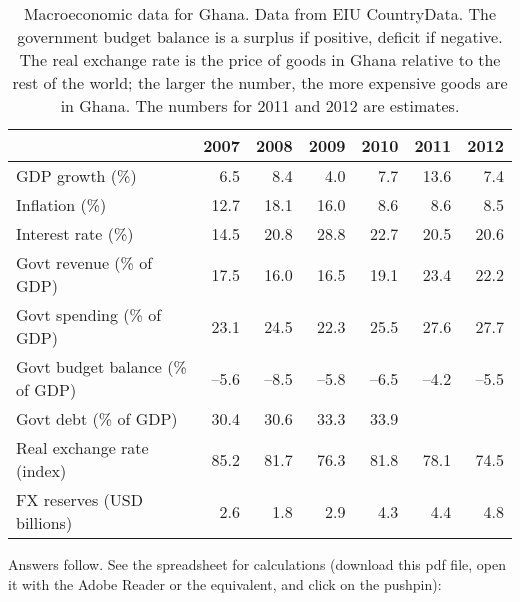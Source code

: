 \documentclass[letterpaper,12pt]{exam}
\begin{document}
\begin{questions}

\begin{table}
\centering
\begin{tabular}{lrrrrrr}
\toprule
        & 2007 & 2008 & 2009 & 2010 & 2011 & 2012 \\
\midrule
GDP growth (\%) & 6.5 & 8.4 & 4.0 & 7.7 & 13.6 & 7.4 \\
Inflation (\%)  & 12.7& 18.1 & 16.0 & 8.6 & 8.6 & 8.5 \\
Interest rate (\%) & 14.5 & 20.8 & 28.8 & 22.7 & 20.5 & 20.6  \\
Govt revenue (\% of GDP)  & 17.5 & 16.0 & 16.5 & 19.1 & 23.4 & 22.2 \\
Govt spending (\% of GDP) & 23.1 & 24.5 & 22.3 & 25.5 & 27.6 & 27.7 \\
Govt budget balance (\% of GDP) & --5.6 & --8.5 & --5.8 & --6.5& --4.2 & --5.5\\
Govt debt (\% of GDP) & 30.4 & 30.6 & 33.3 & 33.9 & {\bf } & {\bf } \\ %
Real exchange rate (index) & 85.2 & 81.7 & 76.3 & 81.8 & 78.1 & 74.5\\
FX reserves (USD billions) & 2.6 & 1.8 & 2.9 & 4.3 & 4.4 & 4.8 \\
\bottomrule
\end{tabular}
\caption{Macroeconomic data for Ghana.
Data from EIU CountryData.
The government budget balance is a surplus if positive, deficit if negative.
The real exchange rate is the price of goods in Ghana relative to the rest
of the world;
the larger the number, the more expensive goods are in Ghana.
The numbers for 2011 and 2012 are estimates.
}
\label{tab:ghana}
\end{table}


\begin{solution}
Answers follow.
See the spreadsheet for calculations
(download this pdf file, open it with the Adobe Reader or the equivalent,
and click on the pushpin):


\end{solution}
\end{questions}
\end{document}
